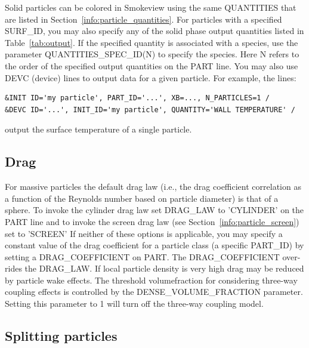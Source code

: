\documentclass[11pt]{book}
\begin{document}
Solid particles can be colored in Smokeview using the same {\ct QUANTITIES} that are listed in Section~\ref{info:particle_quantities}. For particles with a specified {\ct SURF\_ID}, you may also specify any of the solid phase output quantities listed in Table~\ref{tab:output}. If the specified quantity is associated with a species, use the parameter {\ct QUANTITIES\_SPEC\_ID(N)} to specify the species. Here {\ct N} refers to the order of the specified output quantities on the {\ct PART} line. You may also use {\ct DEVC} (device) lines to output data for a given particle. For example, the lines:
\begin{lstlisting}
&INIT ID='my particle', PART_ID='...', XB=..., N_PARTICLES=1 /
&DEVC ID='...', INIT_ID='my particle', QUANTITY='WALL TEMPERATURE' /
\end{lstlisting}

\noindent
output the surface temperature of a single particle.


\subsection{Drag}
\label{info:particle_drag}

For massive particles the default drag law (i.e., the drag coefficient correlation as a function of the Reynolds number based on particle diameter) is that of a sphere. To invoke the cylinder drag law set {\ct DRAG\_LAW} to {\ct 'CYLINDER'} on the {\ct PART} line and to invoke the screen drag law (see Section~\ref{info:particle_screen}) set to {\ct 'SCREEN'}  If neither of these options is applicable, you may specify a constant value of the drag coefficient for a particle class (a specific {\ct PART\_ID}) by setting a {\ct DRAG\_COEFFICIENT} on {\ct PART}. The {\ct DRAG\_COEFFICIENT} over-rides the {\ct DRAG\_LAW}. If local particle density is very high drag may be reduced by particle wake effects. The threshold volumefraction for considering three-way coupling effects is controlled by the {\ct DENSE\_VOLUME\_FRACTION} parameter. Setting this parameter to 1 will turn off the three-way coupling model.

\subsection{Splitting particles}
\label{info:particle_split}
\end{document}

